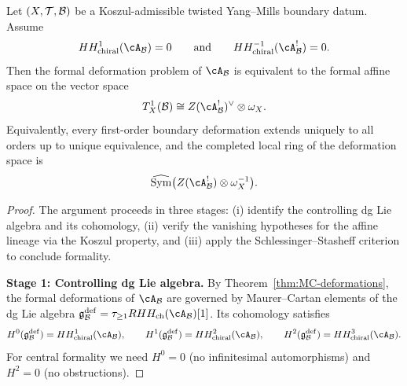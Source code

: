 \begin{theorem}
\label{thm:twisted-ym-central-formality}
Let $(X,\mathcal{T},\mathcal{B})$ be a Koszul-admissible twisted Yang--Mills boundary datum. Assume
\[
HH^{1}_{\mathrm{chiral}}(\cA_{\cB}) = 0
\qquad\text{and}\qquad
HH^{-1}_{\mathrm{chiral}}(\cA_{\cB}^{!}) = 0.
\]
Then the formal deformation problem of $\cA_{\cB}$ is equivalent to the formal affine space on the vector space
\[
T^1_X(\cB)
\cong
Z(\cA_{\cB}^{!})^{\vee}\otimes \omega_X.
\]
Equivalently, every first-order boundary deformation extends uniquely to all orders up to unique equivalence, and the completed local ring of the deformation space is
\[
\widehat{\mathrm{Sym}}\bigl(Z(\cA_{\cB}^{!})\otimes \omega_X^{-1}\bigr).
\]
\end{theorem}

\begin{proof}
The argument proceeds in three stages: (i) identify the controlling dg Lie algebra and its cohomology, (ii) verify the vanishing hypotheses for the affine lineage via the Koszul property, and (iii) apply the Schlessinger--Stasheff criterion to conclude formality.

\medskip\noindent\textbf{Stage 1: Controlling dg Lie algebra.}
By Theorem~\ref{thm:MC-deformations}, the formal deformations of $\cA_{\cB}$ are governed by Maurer--Cartan elements of the dg Lie algebra $\mathfrak{g}^{\mathrm{def}}_{\cB} = \tau_{\ge 1}RHH_{\mathrm{ch}}(\cA_{\cB})[1]$. Its cohomology satisfies
\[
H^0(\mathfrak{g}^{\mathrm{def}}_{\cB}) = HH^{1}_{\mathrm{chiral}}(\cA_{\cB}),
\qquad
H^1(\mathfrak{g}^{\mathrm{def}}_{\cB}) = HH^{2}_{\mathrm{chiral}}(\cA_{\cB}),
\qquad
H^2(\mathfrak{g}^{\mathrm{def}}_{\cB}) = HH^{3}_{\mathrm{chiral}}(\cA_{\cB}).
\]
For central formality we need $H^0 = 0$ (no infinitesimal automorphisms) and $H^2 = 0$ (no obstructions).


\end{proof}
